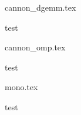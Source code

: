 \begin{figure}[hb]
\centering
\footnotesize
{cannon_dgemm.tex}
\caption{test}
\end{figure}

\begin{figure}[hb]
\centering
\footnotesize
{cannon_omp.tex}
\caption{test}
\end{figure}

\begin{figure}[hb]
\centering
\footnotesize
{mono.tex}
\caption{test}
\end{figure}